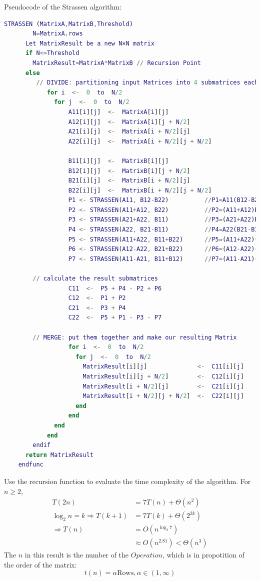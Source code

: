 \documentclass[UTF8]{ctexart}
\begin{document}
Pseudocode of the Strassen algorithm:
\begin{lstlisting}[language=matlab,style=pseudocode]
    STRASSEN (MatrixA,MatrixB,Threshold)
        N=MatrixA.rows
      Let MatrixResult be a new N×N matrix
      if N<=Threshold
        MatrixResult=MatrixA*MatrixB // Recursion Point
      else
         // DIVIDE: partitioning input Matrices into 4 submatrices each
            for i  <-  0  to  N/2
              for j  <-  0  to  N/2
                  A11[i][j]  <-  MatrixA[i][j]
                  A12[i][j]  <-  MatrixA[i][j + N/2]
                  A21[i][j]  <-  MatrixA[i + N/2][j]
                  A22[i][j]  <-  MatrixA[i + N/2][j + N/2]

                  B11[i][j]  <-  MatrixB[i][j]
                  B12[i][j]  <-  MatrixB[i][j + N/2]
                  B21[i][j]  <-  MatrixB[i + N/2][j]
                  B22[i][j]  <-  MatrixB[i + N/2][j + N/2]
                  P1 <- STRASSEN(A11, B12-B22)          //P1=A11(B12-B22)
                  P2 <- STRASSEN(A11+A12, B22)          //P2=(A11+A12)B22
                  P3 <- STRASSEN(A21+A22, B11)          //P3=(A21+A22)B11
                  P4 <- STRASSEN(A22, B21-B11)          //P4=A22(B21-B11)
                  P5 <- STRASSEN(A11+A22, B11+B22)      //P5=(A11+A22)(B11+B22)
                  P6 <- STRASSEN(A12-A22, B21+B22)      //P6=(A12-A22)(B21+B22)
                  P7 <- STRASSEN(A11-A21, B11+B12)      //P7=(A11-A21)(B11+B12)

        // calculate the result submatrices
                  C11  <-  P5 + P4 - P2 + P6
                  C12  <-  P1 + P2
                  C21  <-  P3 + P4
                  C22  <-  P5 + P1 - P3 - P7

        // MERGE: put them together and make our resulting Matrix
                  for i  <-  0  to  N/2
                    for j  <-  0  to  N/2
                      MatrixResult[i][j]              <-  C11[i][j]
                      MatrixResult[i][j + N/2]        <-  C12[i][j]
                      MatrixResult[i + N/2][j]        <-  C21[i][j]
                      MatrixResult[i + N/2][j + N/2]  <-  C22[i][j]
                    end
                  end
              end
            end
        endif
      return MatrixResult
    endfunc
  \end{lstlisting}
Use the recursion function to evaluate the time complexity of the algorithm.
For \(n\geqslant 2\),
\begin{equation}
  \begin{aligned}
    T(2n)                          & =7T(n)+\Theta(n^{2})              \\
    \log_{2} n=k\Rightarrow T(k+1) & =7T(k)+\Theta(2^{2k})             \\
    \Rightarrow T(n)               & =O(n^{\log_{2}7})                 \\
                                   & \approx O(n^{2.81})<\Theta(n^{3})
  \end{aligned}
\end{equation}
The \(n\) in this result is the number of the \(Operation\), which is in propotition of the order of the matrix:
\begin{equation}
  t(n)=\alpha \text{Rows},\alpha\in(1,\infty)
\end{equation}
\end{document}
